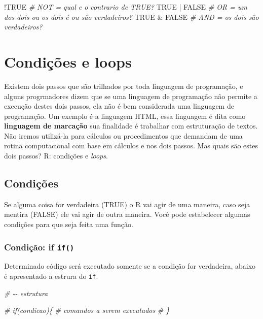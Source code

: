 \documentclass[
]{book}
\newenvironment{Shaded}{\begin{snugshade}}{\end{snugshade}}
\newcommand{\CommentTok}[1]{\textcolor[rgb]{0.56,0.35,0.01}{\textit{#1}}}
\newcommand{\ConstantTok}[1]{\textcolor[rgb]{0.00,0.00,0.00}{#1}}
\newcommand{\SpecialCharTok}[1]{\textcolor[rgb]{0.00,0.00,0.00}{#1}}
\theoremstyle{definition}
\theoremstyle{definition}
\theoremstyle{definition}
\theoremstyle{definition}
\theoremstyle{remark}
\begin{document}
\begin{Shaded}
\begin{Highlighting}[]
\SpecialCharTok{!}\ConstantTok{TRUE} \CommentTok{\# NOT = qual e o contrario de TRUE?}
\ConstantTok{TRUE} \SpecialCharTok{|} \ConstantTok{FALSE} \CommentTok{\# OR = um dos dois ou os dois é ou são verdadeiros?}
\ConstantTok{TRUE} \SpecialCharTok{\&} \ConstantTok{FALSE} \CommentTok{\# AND = os dois são verdadeiros?}
\end{Highlighting}
\end{Shaded}

\hypertarget{condiuxe7uxf5es-e-loops}{%
\section{Condições e loops}\label{condiuxe7uxf5es-e-loops}}

Existem dois passos que são trilhados por toda linguagem de programação, e alguns progrmadores dizem que se uma linguagem de programação não permite a execução destes dois passos, ela não é bem considerada uma linguagem de programação. Um exemplo é a linguagem HTML, essa linguagem é dita como \textbf{linguagem de marcação} sua finalidade é trabalhar com estruturação de textos. Não iremos utilizá-la para cálculos ou procedimentos que demandam de uma rotina computacional com base em cálculos e nos dois passos. Mas quais são estes dois passos? R: condições e \emph{loops}.

\hypertarget{condiuxe7uxf5es}{%
\subsection{Condições}\label{condiuxe7uxf5es}}

Se alguma coisa for verdadeira (TRUE) o R vai agir de uma maneira, caso seja mentira (FALSE) ele vai agir de outra maneira. Você pode estabelecer algumas condições para que seja feita uma função.

\hypertarget{condiuxe7uxe3o-if-if}{%
\subsubsection{\texorpdfstring{Condição: if \texttt{if()}}{Condição: if if()}}\label{condiuxe7uxe3o-if-if}}

Determinado código será executado somente se a condição for verdadeira, abaixo é apresentado a estrura do \texttt{if}.

\begin{Shaded}
\begin{Highlighting}[]
\CommentTok{\# {-}{-} estrutura}

\CommentTok{\# if(condicao)\{}
\CommentTok{\#   comandos a serem executados}
\CommentTok{\# \}}
\end{Highlighting}
\end{Shaded}
\end{document}
